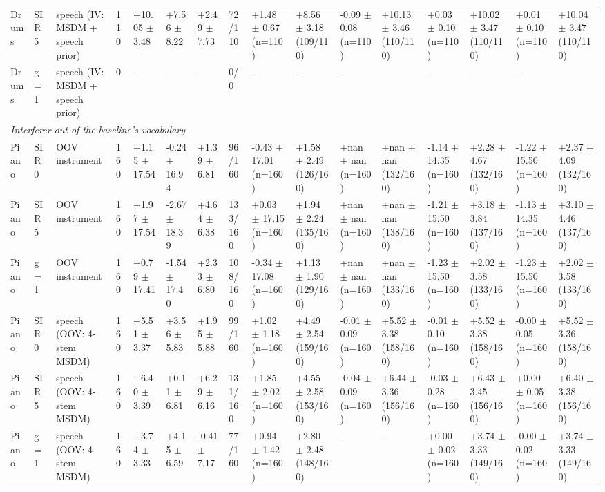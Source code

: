 \begin{tabular}{llllllllllllllll}
Drums & SIR 5 & speech (IV: MSDM + speech prior) & 110 & +10.05 $\pm$ 3.48 & +7.56 $\pm$ 8.22 & +2.49 $\pm$ 7.73 & 72/110 & +1.48 $\pm$ 0.67 (n=110) & +8.56 $\pm$ 3.18 (109/110) & -0.09 $\pm$ 0.08 (n=110) & +10.13 $\pm$ 3.46 (110/110) & +0.03 $\pm$ 0.10 (n=110) & +10.02 $\pm$ 3.47 (110/110) & +0.01 $\pm$ 0.10 (n=110) & +10.04 $\pm$ 3.47 (110/110)\\
Drums & g = 1 & speech (IV: MSDM + speech prior) & 0 & -- & -- & -- & 0/0 & -- & -- & -- & -- & -- & -- & -- & --\\
\midrule
\multicolumn{16}{l}{\emph{Interferer out of the baseline's vocabulary}}\\
Piano & SIR 0 & OOV instrument & 160 & +1.15 $\pm$ 17.54 & -0.24 $\pm$ 16.94 & +1.39 $\pm$ 6.81 & 96/160 & -0.43 $\pm$ 17.01 (n=160) & +1.58 $\pm$ 2.49 (126/160) & +nan $\pm$ nan (n=160) & +nan $\pm$ nan (132/160) & -1.14 $\pm$ 14.35 (n=160) & +2.28 $\pm$ 4.67 (132/160) & -1.22 $\pm$ 15.50 (n=160) & +2.37 $\pm$ 4.09 (132/160)\\
Piano & SIR 5 & OOV instrument & 160 & +1.97 $\pm$ 17.54 & -2.67 $\pm$ 18.39 & +4.64 $\pm$ 6.38 & 133/160 & +0.03 $\pm$ 17.15 (n=160) & +1.94 $\pm$ 2.24 (135/160) & +nan $\pm$ nan (n=160) & +nan $\pm$ nan (138/160) & -1.21 $\pm$ 15.50 (n=160) & +3.18 $\pm$ 3.84 (137/160) & -1.13 $\pm$ 14.35 (n=160) & +3.10 $\pm$ 4.46 (137/160)\\
Piano & g = 1 & OOV instrument & 160 & +0.79 $\pm$ 17.41 & -1.54 $\pm$ 17.40 & +2.33 $\pm$ 6.80 & 108/160 & -0.34 $\pm$ 17.08 (n=160) & +1.13 $\pm$ 1.90 (129/160) & +nan $\pm$ nan (n=160) & +nan $\pm$ nan (133/160) & -1.23 $\pm$ 15.50 (n=160) & +2.02 $\pm$ 3.58 (133/160) & -1.23 $\pm$ 15.50 (n=160) & +2.02 $\pm$ 3.58 (133/160)\\
Piano & SIR 0 & speech (OOV: 4-stem MSDM) & 160 & +5.51 $\pm$ 3.37 & +3.56 $\pm$ 5.83 & +1.95 $\pm$ 5.88 & 99/160 & +1.02 $\pm$ 1.18 (n=160) & +4.49 $\pm$ 2.54 (159/160) & -0.01 $\pm$ 0.09 (n=160) & +5.52 $\pm$ 3.38 (158/160) & -0.01 $\pm$ 0.10 (n=160) & +5.52 $\pm$ 3.38 (158/160) & -0.00 $\pm$ 0.05 (n=160) & +5.52 $\pm$ 3.36 (158/160)\\
Piano & SIR 5 & speech (OOV: 4-stem MSDM) & 160 & +6.40 $\pm$ 3.39 & +0.11 $\pm$ 6.81 & +6.29 $\pm$ 6.16 & 131/160 & +1.85 $\pm$ 2.02 (n=160) & +4.55 $\pm$ 2.58 (153/160) & -0.04 $\pm$ 0.09 (n=160) & +6.44 $\pm$ 3.36 (156/160) & -0.03 $\pm$ 0.28 (n=160) & +6.43 $\pm$ 3.45 (156/160) & +0.00 $\pm$ 0.05 (n=160) & +6.40 $\pm$ 3.38 (156/160)\\
Piano & g = 1 & speech (OOV: 4-stem MSDM) & 160 & +3.74 $\pm$ 3.33 & +4.15 $\pm$ 6.59 & -0.41 $\pm$ 7.17 & 77/160 & +0.94 $\pm$ 1.42 (n=160) & +2.80 $\pm$ 2.48 (148/160) & -- & -- & +0.00 $\pm$ 0.02 (n=160) & +3.74 $\pm$ 3.33 (149/160) & -0.00 $\pm$ 0.02 (n=160) & +3.74 $\pm$ 3.33 (149/160)\\

\end{tabular}
